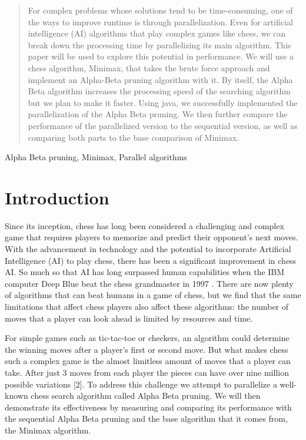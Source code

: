 \documentclass[conference]{IEEEtran}
\begin{document}
\begin{abstract}
For complex problems whose solutions tend to be time-consuming, one of the ways to improve runtime is through parallelization. Even for artificial intelligence (AI) algorithms that play complex games like chess, we can break down the processing time by parallelizing its main algorithm. This paper will be used to explore this potential in performance. We will use a chess algorithm, Minimax, that takes the brute force approach and implement an Alpha-Beta pruning algorithm with it. By itself, the Alpha Beta algorithm increases the processing speed of the searching algorithm but we plan to make it faster. Using java, we successfully implemented the parallelization of the Alpha Beta pruning. We then further compare the performance of the parallelized version to the sequential version, as well as comparing both parts to the base comparison of Minimax.
\end{abstract}

\begin{IEEEkeywords}
Alpha Beta pruning, Minimax, Parallel algorithms
\end{IEEEkeywords}

\section{Introduction}
Since its inception, chess has long been considered a challenging and complex game that requires players to memorize and predict their opponent's next moves. With the advancement in technology and the potential to incorporate Artificial Intelligence (AI) to play chess, there has been a significant improvement in chess AI. So much so that AI has long surpassed human capabilities when the IBM computer Deep Blue beat the chess grandmaster in 1997 \cite{b1}. There are now plenty of algorithms that can beat humans in a game of chess, but we find that the same limitations that affect chess players also affect these algorithms: the number of moves that a player can look ahead is limited by resources and time.\vspace{10pt}

For simple games such as tic-tac-toe or checkers, an algorithm could determine the winning moves after a player's first or second move. But what makes chess such a complex game is the almost limitless amount of moves that a player can take. After just 3 moves from each player the pieces can have over nine million possible variations [2]. To address this challenge we attempt to parallelize a well-known chess search algorithm called Alpha Beta pruning. We will then demonstrate its effectiveness by measuring and comparing its performance with the sequential Alpha Beta pruning and the base algorithm that it comes from, the Minimax algorithm.
\end{document}
